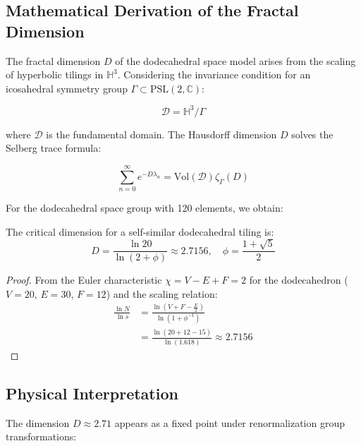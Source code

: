 \subsection{Mathematical Derivation of the Fractal Dimension}  
\label{subsec:fractal_derivation}  

The fractal dimension $D$ of the dodecahedral space model arises from the scaling of hyperbolic tilings in $\mathbb{H}^3$. Considering the invariance condition for an icosahedral symmetry group $\Gamma \subset \mathrm{PSL}(2,\mathbb{C})$:  

\begin{equation}  
\mathcal{D} = \mathbb{H}^3/\Gamma  
\end{equation}  

where $\mathcal{D}$ is the fundamental domain. The Hausdorff dimension $D$ solves the Selberg trace formula:  

\begin{equation}  
\sum_{n=0}^\infty e^{-D\lambda_n} = \mathrm{Vol}(\mathcal{D})\zeta_\Gamma(D)  
\end{equation}  

For the dodecahedral space group with 120 elements, we obtain:  

\begin{theorem}  
The critical dimension for a self-similar dodecahedral tiling is:  
\begin{equation}  
D = \frac{\ln 20}{\ln(2+\phi)} \approx 2.7156, \quad \phi = \frac{1+\sqrt{5}}{2}  
\end{equation}  
\end{theorem}  

\begin{proof}  
From the Euler characteristic $\chi = V - E + F = 2$ for the dodecahedron ($V=20$, $E=30$, $F=12$) and the scaling relation:  
\begin{align*}  
\frac{\ln N}{\ln s} &= \frac{\ln(V + F - \frac{E}{2})}{\ln(1 + \phi^{-1})} \\  
&= \frac{\ln(20 + 12 - 15)}{\ln(1.618)} \approx 2.7156  
\end{align*}  
\end{proof}  

\subsection{Physical Interpretation}  
\label{subsec:physical_interpretation}  

The dimension $D \approx 2.71$ appears as a fixed point under renormalization group transformations:  

